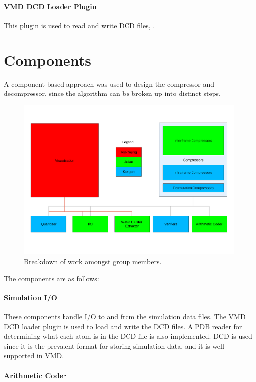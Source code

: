 \documentclass[a4paper]{report}
\begin{document}
\paragraph{VMD DCD Loader Plugin}
This plugin is used to read and write DCD files, \citep{vmd}.


\section{Components}
\label{sec:components}

A component-based approach was used to design the compressor and decompressor,
since the algorithm can be broken up into distinct steps.

\begin{figure}
  \centering
  \includegraphics[trim = 0mm 25mm 0mm 25mm, clip, width=\textwidth]{images/breakdown}
  \caption{Breakdown of work amongst group members.}
\end{figure}

The components are as follows:

\paragraph{Simulation I/O}

These components handle I/O to and from the simulation data files. The VMD DCD
loader plugin is used to load and write the DCD files. A PDB reader for
determining what each atom is in the DCD file is also implemented. DCD is used
since it is the prevalent format for storing simulation data, and it is well
supported in VMD.


\paragraph{Arithmetic Coder}
\end{document}

